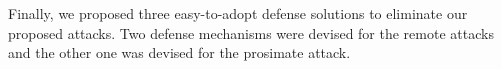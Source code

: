 Finally, we proposed three easy-to-adopt defense solutions to eliminate our proposed attacks. Two defense mechanisms were devised for the remote attacks and the other one was devised for the prosimate attack.

